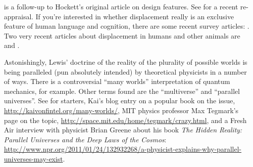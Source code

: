 \cite{hockett-altmann-1968-design} is a follow-up to Hockett's original article
on design features. See \cite{emonds-2011-primate-human} for a recent
re-appraisal. If you're interested in whether displacement really is an
exclusive feature of human language and cognition, there are some recent survey
articles: \cite{cheke-clayton-2010-mtt,redshaw-2014-mtt}. Two very recent
articles about displacement in humans and other animals are
\cite{leahy-carey-2020-modal-acquisition} and
\cite{redshaw-suddendorf-2020-timelines}.

\enlargethispage{24pt}
Astonishingly, Lewis' doctrine of the reality of the plurality of possible
worlds is being paralleled (pun absolutely intended) by theoretical physicists
in a number of ways. There is a controversial ``many worlds'' interpretation of
quantum mechanics, for example. Other terms found are the ``multiverse'' and
``parallel universes''. See for starters, Kai's blog entry on a popular book on
the issue, \url{http://kaivonfintel.org/many-worlds/}, MIT physics professor Max
Tegmark's page on the topic, \url{http://space.mit.edu/home/tegmark/crazy.html},
and a Fresh Air interview with physicist Brian Greene about his book \emph{The
  Hidden Reality: Parallel Universes and the Deep Laws of the Cosmos}:
\url{http://www.npr.org/2011/01/24/132932268/a-physicist-explains-why-parallel-universes-may-exist}.

